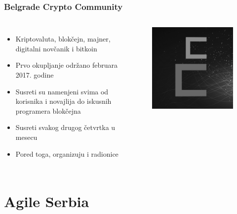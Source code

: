 \documentclass[hyperref={bookmarks=false},aspectratio=169]{beamer}
\begin{document}
\begin{frame}
\frametitle{Belgrade Crypto Community}

\begin{columns}[T]

\begin{itemize}
    \item Kriptovaluta, blokčejn, majner, digitalni novčanik i bitkoin
    \item Prvo okupljanje održano februara 2017. godine
    \item Susreti su namenjeni svima od korisnika i novajlija do iskusnih programera blokčejna
    \item Susreti svakog drugog četvrtka u mesecu
    \item Pored toga, organizuju i radionice
\end{itemize}



\begin{figure}
    \raggedleft
    \includegraphics[scale=0.25]{./images/bcc_logo.png}
\end{figure}

\end{columns}
\end{frame}


\section{Agile Serbia}
\end{document}
